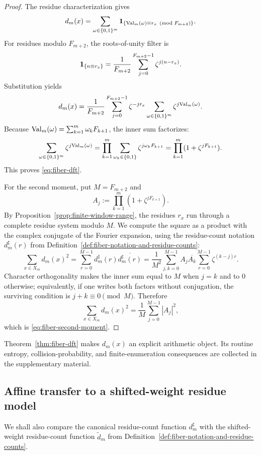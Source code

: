 \begin{proof}
The residue characterization gives
\[
d_m(x)=
\sum_{\omega\in\{0,1\}^m}
\mathbf{1}_{\{\mathrm{Val}_m(\omega)\equiv r_x\pmod {F_{m+2}}\}}.
\]
For residues modulo $F_{m+2}$, the roots-of-unity filter is
\[
\mathbf{1}_{\{n\equiv r_x\}}
=
\frac{1}{F_{m+2}}
\sum_{j=0}^{F_{m+2}-1}\zeta^{j(n-r_x)}.
\]
Substitution yields
\[
d_m(x)=
\frac{1}{F_{m+2}}
\sum_{j=0}^{F_{m+2}-1}\zeta^{-jr_x}
\sum_{\omega\in\{0,1\}^m}\zeta^{j\mathrm{Val}_m(\omega)}.
\]
Because $\mathrm{Val}_m(\omega)=\sum_{k=1}^m\omega_kF_{k+1}$, the inner sum
factorizes:
\[
\sum_{\omega\in\{0,1\}^m}\zeta^{j\mathrm{Val}_m(\omega)}
=
\prod_{k=1}^m
\sum_{\omega_k\in\{0,1\}}\zeta^{j\omega_kF_{k+1}}
=
\prod_{k=1}^m(1+\zeta^{jF_{k+1}}).
\]
This proves \eqref{eq:fiber-dft}.

For the second moment, put $M=F_{m+2}$ and
\[
A_j:=\prod_{k=1}^m(1+\zeta^{jF_{k+1}}).
\]
By Proposition~\ref{prop:finite-window-range}, the residues $r_x$ run through
a complete residue system modulo $M$.  We compute the square as a product with
the complex conjugate of the Fourier expansion, using the residue-count
notation $d_m^\sharp(r)$ from
Definition~\ref{def:fiber-notation-and-residue-counts}:
\[
\sum_{x\in X_m}d_m(x)^2
=
\sum_{r=0}^{M-1}d_m^\sharp(r)\overline{d_m^\sharp(r)}
=
\frac{1}{M^2}
\sum_{j,k=0}^{M-1}A_j\overline{A_k}
\sum_{r=0}^{M-1}\zeta^{(k-j)r}.
\]
Character orthogonality makes the inner sum equal to $M$ when $j=k$ and to
$0$ otherwise; equivalently, if one writes both factors without conjugation,
the surviving condition is $j+k\equiv0\pmod M$.  Therefore
\[
\sum_{x\in X_m}d_m(x)^2
=
\frac{1}{M}\sum_{j=0}^{M-1}|A_j|^2,
\]
which is \eqref{eq:fiber-second-moment}.
\end{proof}

\begin{remark}
Theorem~\ref{thm:fiber-dft} makes $d_m(x)$ an explicit arithmetic object.
Its routine entropy, collision-probability, and finite-enumeration consequences
are collected in the supplementary material.
\end{remark}

\subsection{Affine transfer to a shifted-weight residue model}\label{sec:stab:transfer}

We shall also compare the canonical residue-count function
$d_m^\sharp$ with the shifted-weight residue-count function
$\widetilde d_m$ from
Definition~\ref{def:fiber-notation-and-residue-counts}.

